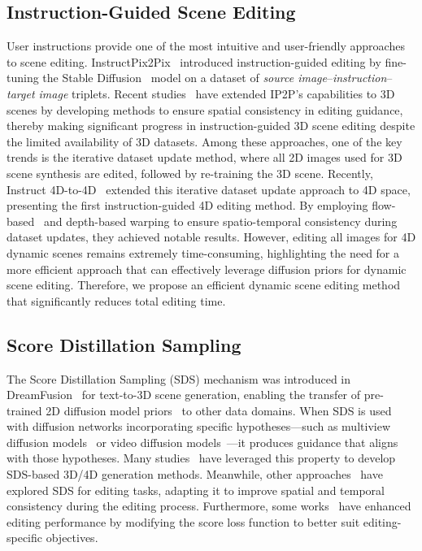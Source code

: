 \subsection{Instruction-Guided Scene Editing}
User instructions provide one of the most intuitive and user-friendly approaches to scene editing. InstructPix2Pix~\cite{ref_1_ip2p} introduced instruction-guided editing by fine-tuning the Stable Diffusion~\cite{ref_2_ldm} model on a dataset of \textit{source image}–\textit{instruction}–\textit{target image} triplets. Recent studies~\cite{ref_3_in2n, ref_5_gaussianeditor, ref_6_dge, ref_7_tiger, ref_28_i3dto3d, ref_32_vicanerf} have extended IP2P's capabilities to 3D scenes by developing methods to ensure spatial consistency in editing guidance, thereby making significant progress in instruction-guided 3D scene editing despite the limited availability of 3D datasets. Among these approaches, one of the key trends is the iterative dataset update method, where all 2D images used for 3D scene synthesis are edited, followed by re-training the 3D scene. Recently, Instruct 4D-to-4D~\cite{ref_9_i4d24d} extended this iterative dataset update approach to 4D space, presenting the first instruction-guided 4D editing method. By employing flow-based~\cite{ref_53_raft} and depth-based warping to ensure spatio-temporal consistency during dataset updates, they achieved notable results. However, editing all images for 4D dynamic scenes remains extremely time-consuming, highlighting the need for a more efficient approach that can effectively leverage diffusion priors for dynamic scene editing. Therefore, we propose an efficient dynamic scene editing method that significantly reduces total editing time.


\subsection{Score Distillation Sampling}
 The Score Distillation Sampling (SDS) mechanism was introduced in DreamFusion~\cite{ref_18_dreamfusion} for text-to-3D scene generation, enabling the transfer of pre-trained 2D diffusion model priors~\cite{ref_1_ip2p, ref_2_ldm, ref_26_ddpm} to other data domains. When SDS is used with diffusion networks incorporating specific hypotheses—such as multiview diffusion models~\cite{ref_20_mvdream, ref_52_imagedream} or video diffusion models~\cite{ref_21_tuneavideo, ref_54_vdm, ref_55_lumiere, ref_56_makeavideo, ref_57_align, ref_58_sora}—it produces guidance that aligns with those hypotheses. Many studies~\cite{ref_17_dreamgaussian4d, ref_18_dreamfusion, ref_19_aligngs, ref_25_4dfy, ref_59_dreamgs, ref_60_dreamer, ref_61_magic3d} have leveraged this property to develop SDS-based 3D/4D generation methods. Meanwhile, other approaches~\cite{ref_7_tiger, ref_28_i3dto3d, ref_62_prolific, ref_63_dreameditor, ref_64_focal, ref_65_progressive} have explored SDS for editing tasks, adapting it to improve spatial and temporal consistency during the editing process. Furthermore, some works~\cite{ref_34_deltadenoising,ref_35_posterior,ref_36_collaborative} have enhanced editing performance by modifying the score loss function to better suit editing-specific objectives.
\vspace{4mm}